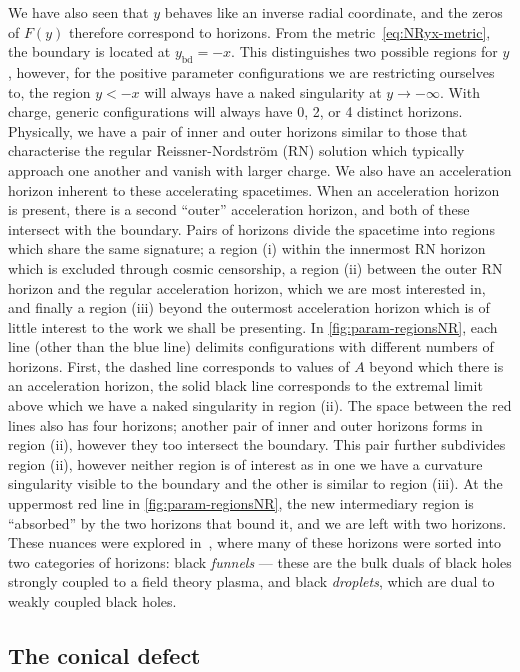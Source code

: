 \documentclass[
twoside,
openright,
frontopenright,
]{dmathesis}
\begin{document}
We have also seen that $y$ behaves like an inverse radial coordinate, and the
zeros of $F(y)$ therefore correspond to horizons. From the
metric~\eqref{eq:NRyx-metric}, the boundary is located at $y_\mathrm{bd} =
-x$. This distinguishes two possible regions for $y$, however, for the positive
parameter configurations we are restricting ourselves to, the region $y<-x$ will
always have a naked singularity at $y \to -\infty$. With charge, generic
configurations will always have 0, 2, or 4 distinct horizons. Physically, we
have a pair of inner and outer horizons similar to those that characterise the
regular Reissner-Nordstr\"om (RN) solution which typically approach one another
and vanish with larger charge. We also have an acceleration horizon inherent to
these accelerating spacetimes. When an acceleration horizon is present, there is
a second ``outer'' acceleration horizon, and both of these intersect with the
boundary. Pairs of horizons divide the spacetime into regions which share the
same signature; a region (i) within the innermost RN horizon which is excluded
through cosmic censorship, a region (ii) between the outer RN horizon and the
regular acceleration horizon, which we are most interested in, and finally a
region (iii) beyond the outermost acceleration horizon which is of little
interest to the work we shall be presenting. In \cref{fig:param-regionsNR}, each
line (other than the blue line) delimits configurations with different numbers
of horizons. First, the dashed line corresponds to values of $A$ beyond which
there is an acceleration horizon, the solid black line corresponds to the
extremal limit above which we have a naked singularity in region (ii). The space
between the red lines also has four horizons; another pair of inner and outer
horizons forms in region (ii), however they too intersect the boundary. This
pair further subdivides region (ii), however neither region is of interest as in
one we have a curvature singularity visible to the boundary and the other is
similar to region (iii). At the uppermost red line in
\cref{fig:param-regionsNR}, the new intermediary region is ``absorbed'' by the
two horizons that bound it, and we are left with two horizons. These nuances
were explored in~\cite{Hubeny:2009kz}, where many of these horizons were sorted
into two categories of horizons: black \emph{funnels} --- these are the bulk
duals of black holes strongly coupled to a field theory plasma, and black
\emph{droplets}, which are dual to weakly coupled black holes.

\subsection{The conical defect}
\label{sec:conical}
\end{document}
